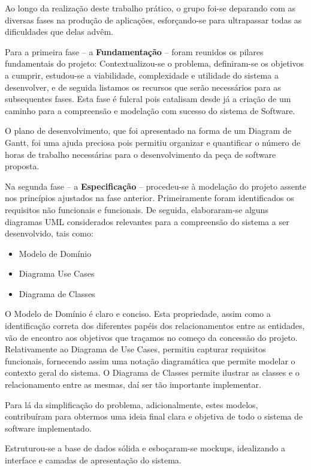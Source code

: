 Ao longo da realização deste trabalho prático, o grupo foi-se deparando com as diversas fases na produção de aplicações, esforçando-se para ultrapassar todas as dificuldades que delas advêm.

Para a primeira fase – a \textbf{Fundamentação} – foram reunidos os pilares fundamentais do projeto: Contextualizou-se o problema, definiram-se os objetivos a cumprir, estudou-se a viabilidade, complexidade e utilidade do sistema a desenvolver, e de seguida listamos os recursos que serão necessários para as subsequentes fases. Esta fase é fulcral pois catalisam desde já a criação de um caminho para a compreensão e modelação com sucesso do sistema de Software.

O plano de desenvolvimento, que foi apresentado na forma de um Diagram de Gantt, foi uma ajuda preciosa pois permitiu organizar e quantificar o número de horas de trabalho necessárias para o desenvolvimento da peça de software proposta.

Na segunda fase – a \textbf{Especificação} – procedeu-se à modelação do projeto assente nos princípios ajustados na fase anterior. Primeiramente foram identificados os requisitos não funcionais e funcionais. De seguida, elaboraram-se alguns diagramas UML considerados relevantes para a compreensão do sistema a ser desenvolvido, tais como: 
\begin{itemize}
    \item Modelo de Domínio
    \item Diagrama Use Cases
    \item Diagrama de Classes
\end{itemize}

O Modelo de Domínio é claro e conciso. Esta propriedade, assim como a identificação correta dos diferentes papéis dos relacionamentos entre as entidades, vão de encontro aos objetivos que traçamos no começo da concessão do projeto. Relativamente ao Diagrama de Use Cases, permitiu capturar requisitos funcionais, fornecendo assim uma notação diagramática que permite modelar o contexto geral do sistema. O Diagrama de Classes permite ilustrar as classes e o relacionamento entre as mesmas, daí ser tão importante implementar.

Para lá da simplificação do problema, adicionalmente, estes modelos, contribuíram para obtermos uma ideia final clara e objetiva de todo o sistema de software implementado.

Estruturou-se a base de dados sólida e esboçaram-se mockups, idealizando a interface e camadas de apresentação do sistema.

